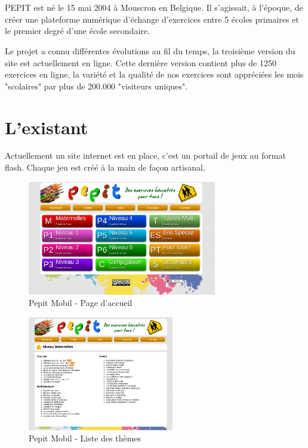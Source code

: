 \section{\pepit}
PEPIT est né le 15 mai 2004 à Mouscron en Belgique. Il s'agissait, à l'époque, de créer une plateforme numérique d'échange d'exercices entre 5 écoles primaires et le premier degré d'une école secondaire.


Le projet a connu différentes évolutions au fil du temps, la troisième version du site est actuellement en ligne. Cette dernière version contient plus de 1250 exercices en ligne, la variété et la qualité de nos exercices sont appréciées les mois "scolaires" par plus de 200.000 "visiteurs uniques".


\section{L'existant}
Actuellement un site internet est en place, c'est un portail de jeux au format flash. Chaque jeu est créé à la main de façon artisanal.

\begin{figure}[H]
\begin{center}
\includegraphics[height=5cm]{images/pepit_be_homepage}
\end{center}
\caption{Pepit Mobil - Page d'accueil}
\label{Pepit Mobil - Page d'accueil}
\end{figure}

\begin{figure}[H]
\begin{center}
\includegraphics[height=5cm]{images/pepit_be_list}
\end{center}
\caption{Pepit Mobil - Liste des thèmes}
\label{Pepit Mobil - Liste des thèmes}
\end{figure}

